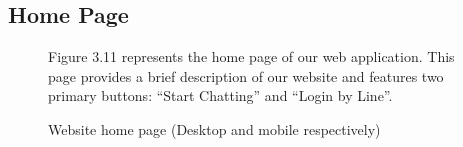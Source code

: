 \documentclass[12pt,oneside,openright,a4paper]{cpe-english-project}
\begin{document}
    \subsection{Home Page}
    \begin{figure}[!h]
      \centering
      \begin{minipage}{.5\textwidth}
        \centering
      \end{minipage}%
      \begin{minipage}{.3\textwidth}
        \centering
      \end{minipage}
      \caption{Website home page (Desktop and mobile respectively)}\label{fig:HomePage}
      \begin{flushleft}
        \qquad Figure 3.11 represents the home page of our web application. This page provides a brief description of our website and features two primary buttons: “Start Chatting” and “Login by Line”.

\end{flushleft}
\end{figure}
\end{document}
